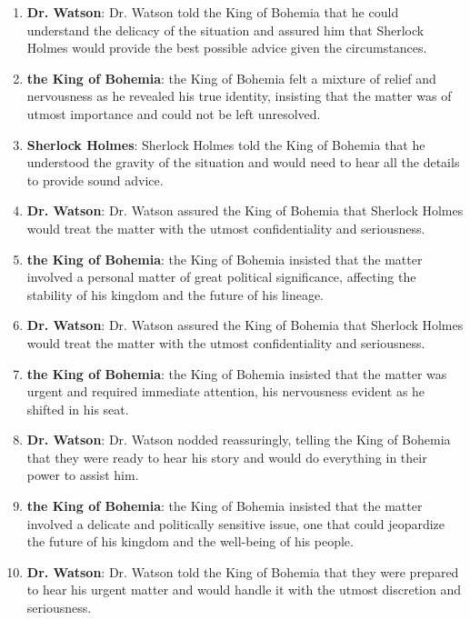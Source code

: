 \documentclass[10pt]{article}
\begin{document}
\begin{enumerate}\setlength{\itemsep}{1pt}\small

\item \textbf{Dr. Watson}: Dr. Watson told the King of Bohemia that he could understand the delicacy of the situation and assured him that Sherlock Holmes would provide the best possible advice given the circumstances.

\item \textbf{the King of Bohemia}: the King of Bohemia felt a mixture of relief and nervousness as he revealed his true identity, insisting that the matter was of utmost importance and could not be left unresolved.

\item \textbf{Sherlock Holmes}: Sherlock Holmes told the King of Bohemia that he understood the gravity of the situation and would need to hear all the details to provide sound advice.

\item \textbf{Dr. Watson}: Dr. Watson assured the King of Bohemia that Sherlock Holmes would treat the matter with the utmost confidentiality and seriousness.

\item \textbf{the King of Bohemia}: the King of Bohemia insisted that the matter involved a personal matter of great political significance, affecting the stability of his kingdom and the future of his lineage.

\item \textbf{Dr. Watson}: Dr. Watson assured the King of Bohemia that Sherlock Holmes would treat the matter with the utmost confidentiality and seriousness.

\item \textbf{the King of Bohemia}: the King of Bohemia insisted that the matter was urgent and required immediate attention, his nervousness evident as he shifted in his seat.

\item \textbf{Dr. Watson}: Dr. Watson nodded reassuringly, telling the King of Bohemia that they were ready to hear his story and would do everything in their power to assist him.

\item \textbf{the King of Bohemia}: the King of Bohemia insisted that the matter involved a delicate and politically sensitive issue, one that could jeopardize the future of his kingdom and the well-being of his people.

\item \textbf{Dr. Watson}: Dr. Watson told the King of Bohemia that they were prepared to hear his urgent matter and would handle it with the utmost discretion and seriousness.


\end{enumerate}
\end{document}
